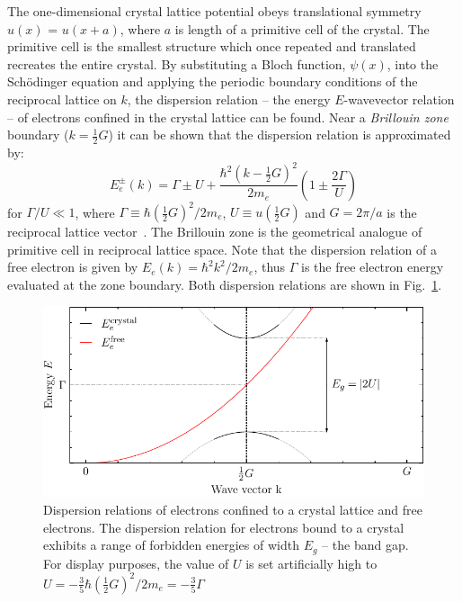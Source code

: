 The one-dimensional crystal lattice potential obeys translational symmetry $u(x)$ = $u(x + a)$, where $a$ is length of a primitive cell of the crystal. The primitive cell is the smallest structure which once repeated and translated recreates the entire crystal. By substituting a Bloch function, $\psi(x)$, into the Sch\"odinger equation and applying the periodic boundary conditions of the reciprocal lattice on $k$, the dispersion relation -- the energy $E$-wavevector relation -- of electrons confined in the crystal lattice can be found. Near a \textit{Brillouin zone} boundary ($k = \frac{1}{2}G$) it can be shown that the dispersion relation is approximated by:
\begin{equation}
	E_e^\pm(k) =  \Gamma \pm U + \frac{\hbar^2\left(k-\frac{1}{2}G\right)^2}{2m_e}\left(1 \pm \frac{2\Gamma}{U}\right)
	\label{eq:dispersion_crystal}
\end{equation}
for $\Gamma/U \ll 1$, where $\Gamma \equiv \hbar\left(\frac{1}{2}G\right)^2/2m_e$, $U \equiv u\left(\frac{1}{2}G\right)$ and $G = 2\pi/a$ is the reciprocal lattice vector~\cite{kittel}. The Brillouin zone is the geometrical analogue of primitive cell in reciprocal lattice space. Note that the dispersion relation of a free electron is given by $E_e(k) = \hbar^2k^2/2m_e$, thus $\Gamma$ is the free electron energy evaluated at the zone boundary. Both dispersion relations are shown in Fig.~\ref{fig:bandgap}.
\begin{figure}[htb]
	\centering
	\includegraphics[width=5in]{figs/ge/band_gap_width_5in.pdf}
	\caption{Dispersion relations of electrons confined to a crystal lattice and free electrons. The dispersion relation for electrons bound to a crystal exhibits a range of forbidden energies of width $E_g$ -- the band gap. For display purposes, the value of $U$ is set artificially high to $U=-\frac{3}{5}\hbar\left(\frac{1}{2}G\right)^2/2m_e =-\frac{3}{5}\Gamma$} 
	\label{fig:bandgap}
\end{figure}

